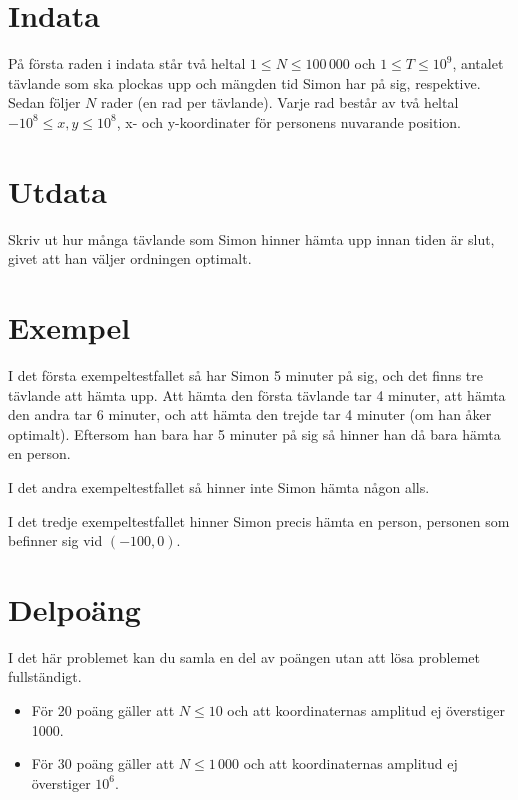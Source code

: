 \section*{Indata}
På första raden i indata står två heltal $1 \leq N \leq 100\,000$ och $1 \leq T \leq 10^9$, antalet tävlande som ska plockas upp och mängden tid Simon har på sig, respektive. Sedan följer $N$ rader (en rad per tävlande). Varje rad består av två heltal $-10^8 \leq x, y \leq 10^8$, x- och y-koordinater för personens nuvarande position.

\section*{Utdata}
Skriv ut hur många tävlande som Simon hinner hämta upp innan tiden är slut, givet att han väljer ordningen optimalt.

\section*{Exempel}
I det första exempeltestfallet så har Simon 5 minuter på sig, och det finns tre tävlande att hämta upp. Att hämta den första tävlande tar 4 minuter, att hämta den andra tar 6 minuter, och att hämta den trejde tar 4 minuter (om han åker optimalt). Eftersom han bara har 5 minuter på sig så hinner han då bara hämta en person.

I det andra exempeltestfallet så hinner inte Simon hämta någon alls.

I det tredje exempeltestfallet hinner Simon precis hämta en person, personen som befinner sig vid $(-100, 0)$.

\section*{Delpoäng}
I det här problemet kan du samla en del av poängen utan att lösa problemet fullständigt.

\begin{itemize}
    \item För 20 poäng gäller att $N \leq 10$ och att koordinaternas amplitud ej överstiger 1000.
    \item För 30 poäng gäller att $N \leq 1\,000$ och att koordinaternas amplitud ej överstiger $10^6$.
\end{itemize}
